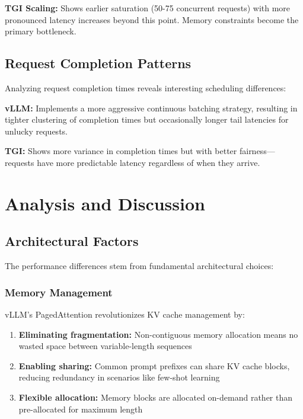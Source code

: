\documentclass{article}
\begin{document}
\textbf{TGI Scaling:} Shows earlier saturation (50-75 concurrent requests) with more pronounced latency increases beyond this point. Memory constraints become the primary bottleneck.

\subsection{Request Completion Patterns}

Analyzing request completion times reveals interesting scheduling differences:

\textbf{vLLM:} Implements a more aggressive continuous batching strategy, resulting in tighter clustering of completion times but occasionally longer tail latencies for unlucky requests.

\textbf{TGI:} Shows more variance in completion times but with better fairness—requests have more predictable latency regardless of when they arrive.

\section{Analysis and Discussion}

\subsection{Architectural Factors}

The performance differences stem from fundamental architectural choices:

\subsubsection{Memory Management}

vLLM's PagedAttention revolutionizes KV cache management by:

\begin{enumerate}
    \item \textbf{Eliminating fragmentation:} Non-contiguous memory allocation means no wasted space between variable-length sequences
    
    \item \textbf{Enabling sharing:} Common prompt prefixes can share KV cache blocks, reducing redundancy in scenarios like few-shot learning
    
    \item \textbf{Flexible allocation:} Memory blocks are allocated on-demand rather than pre-allocated for maximum length
\end{enumerate}
\end{document}
